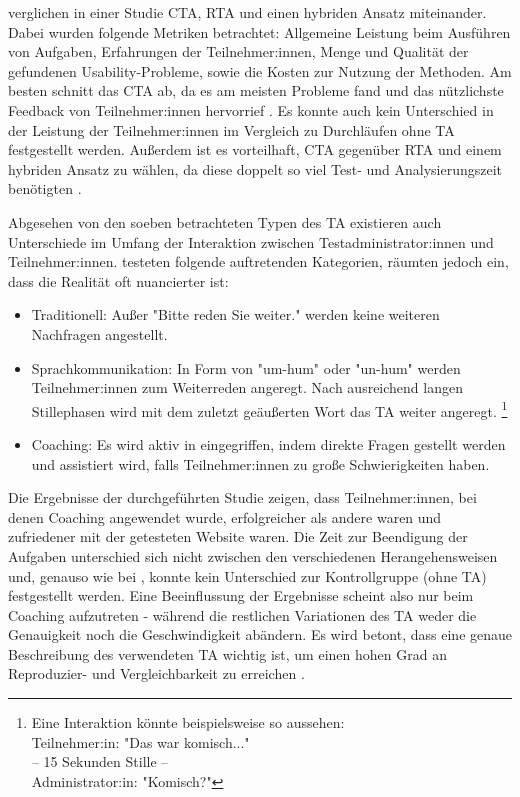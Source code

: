 \textcite{alhadretiRethinkingThinking2018} verglichen in einer Studie \ac{CTA}, \ac{RTA} und einen hybriden Ansatz miteinander. Dabei wurden folgende Metriken betrachtet: Allgemeine Leistung beim Ausführen von Aufgaben, Erfahrungen der Teilnehmer:innen, Menge und Qualität der gefundenen Usability-Probleme, sowie die Kosten zur Nutzung der Methoden. Am besten schnitt das \acl{CTA} ab, da es am meisten Probleme fand und das nützlichste Feedback von Teilnehmer:innen hervorrief \parencite{alhadretiRethinkingThinking2018}. Es konnte auch kein Unterschied in der Leistung der Teilnehmer:innen im Vergleich zu Durchläufen ohne \ac{TA} festgestellt werden. Außerdem ist es vorteilhaft, \ac{CTA} gegenüber \ac{RTA} und einem hybriden Ansatz zu wählen, da diese doppelt so viel Test- und Analysierungszeit benötigten \parencite{alhadretiRethinkingThinking2018}.

Abgesehen von den soeben betrachteten Typen des \acl{TA} existieren auch Unterschiede im Umfang der Interaktion zwischen Testadministrator:innen und Teilnehmer:innen. \textcite{olmsted-hawalaThinkaloudProtocols2010} testeten folgende auftretenden Kategorien, räumten jedoch ein, dass die Realität oft nuancierter ist:
\begin{itemize}
  \item Traditionell: Außer "Bitte reden Sie weiter." werden keine weiteren Nachfragen angestellt.
  \item Sprachkommunikation: In Form von "um-hum" oder "un-hum" werden Teilnehmer:innen zum Weiterreden angeregt. Nach ausreichend langen Stillephasen wird mit dem zuletzt geäußerten Wort das \acl{TA} weiter angeregt. \footnote{Eine Interaktion könnte beispielsweise so aussehen:\\ Teilnehmer:in: "Das war komisch..." \\ -- 15 Sekunden Stille -- \\ Administrator:in: "Komisch?"}
  \item Coaching: Es wird aktiv in eingegriffen, indem direkte Fragen gestellt werden und assistiert wird, falls Teilnehmer:innen zu große Schwierigkeiten haben.
\end{itemize}
Die Ergebnisse der \citeyear{olmsted-hawalaThinkaloudProtocols2010} durchgeführten Studie zeigen, dass Teilnehmer:innen, bei denen Coaching angewendet wurde, erfolgreicher als andere waren und zufriedener mit der getesteten Website waren. Die Zeit zur Beendigung der Aufgaben unterschied sich nicht zwischen den verschiedenen Herangehensweisen und, genauso wie bei \citeauthor{alhadretiRethinkingThinking2018}, konnte kein Unterschied zur Kontrollgruppe (ohne \ac{TA}) festgestellt werden. Eine Beeinflussung der Ergebnisse scheint also nur beim Coaching aufzutreten - während die restlichen Variationen des \ac{TA} weder die Genauigkeit noch die Geschwindigkeit abändern. Es wird betont, dass eine genaue Beschreibung des verwendeten \acl{TA} wichtig ist, um einen hohen Grad an Reproduzier- und Vergleichbarkeit zu erreichen \parencite{alhadretiRethinkingThinking2018}.


